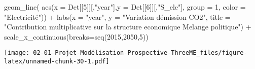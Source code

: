 \documentclass[
]{article}
\newenvironment{Shaded}{\begin{snugshade}}{\end{snugshade}}
\newcommand{\AttributeTok}[1]{\textcolor[rgb]{0.77,0.63,0.00}{#1}}
\newcommand{\DecValTok}[1]{\textcolor[rgb]{0.00,0.00,0.81}{#1}}
\newcommand{\FunctionTok}[1]{\textcolor[rgb]{0.00,0.00,0.00}{#1}}
\newcommand{\NormalTok}[1]{#1}
\newcommand{\SpecialCharTok}[1]{\textcolor[rgb]{0.00,0.00,0.00}{#1}}
\newcommand{\StringTok}[1]{\textcolor[rgb]{0.31,0.60,0.02}{#1}}
\begin{document}
\begin{Shaded}
\begin{Highlighting}[]
  \FunctionTok{geom\_line}\NormalTok{( }\FunctionTok{aes}\NormalTok{(}\AttributeTok{x =}\NormalTok{ Det[[}\DecValTok{5}\NormalTok{]][,}\StringTok{"year"}\NormalTok{],}\AttributeTok{y =}\NormalTok{ Det[[}\DecValTok{6}\NormalTok{]][,}\StringTok{"S\_ele"}\NormalTok{], }\AttributeTok{group =} \DecValTok{1}\NormalTok{, }\AttributeTok{color =} \StringTok{"Electricité"}\NormalTok{)) }\SpecialCharTok{+}
  \FunctionTok{labs}\NormalTok{(}\AttributeTok{x =} \StringTok{"year"}\NormalTok{, }\AttributeTok{y =} \StringTok{"Variation d\textquotesingle{}émission CO2"}\NormalTok{, }\AttributeTok{title =} \StringTok{"Contribution multiplicative sur la structure economique Melange politique"}\NormalTok{) }\SpecialCharTok{+} 
  \FunctionTok{scale\_x\_continuous}\NormalTok{(}\AttributeTok{breaks=}\FunctionTok{seq}\NormalTok{(}\DecValTok{2015}\NormalTok{,}\DecValTok{2050}\NormalTok{,}\DecValTok{5}\NormalTok{))}
\end{Highlighting}
\end{Shaded}

\texttt{[image: 02-01---Projet-Modélisation-Prospective-ThreeME\_files/figure-latex/unnamed-chunk-30-1.pdf]}
\end{document}
